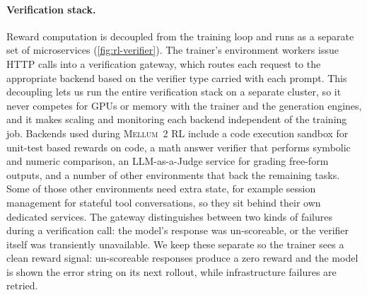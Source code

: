 \documentclass{llmxive}
\providecommand{\modelname}{\textsc{Mellum~2}\xspace}
\begin{document}
\paragraph{Verification stack.}
Reward computation is decoupled from the training loop and runs as a
separate set of microservices (\cref{fig:rl-verifier}). The trainer's
environment workers issue HTTP calls into a verification gateway, which
routes each request to the appropriate backend based on the verifier
type carried with each prompt. This decoupling lets us run the entire
verification stack on a separate cluster, so it never competes for GPUs
or memory with the trainer and the generation engines, and it makes
scaling and monitoring each backend independent of the training job.
Backends used during \modelname{} RL include a code execution sandbox
for unit-test based rewards on code, a math answer verifier that
performs symbolic and numeric comparison, an LLM-as-a-Judge service for
grading free-form outputs, and a number of other environments that back
the remaining tasks. Some of those other environments need extra state,
for example session management for stateful tool conversations, so they
sit behind their own dedicated services. The gateway distinguishes
between two kinds of failures during a verification call: the model's
response was un-scoreable, or the verifier itself was transiently
unavailable. We keep these separate so the trainer sees a clean reward
signal: un-scoreable responses produce a zero reward and the model is
shown the error string on its next rollout, while infrastructure
failures are retried.
\end{document}
